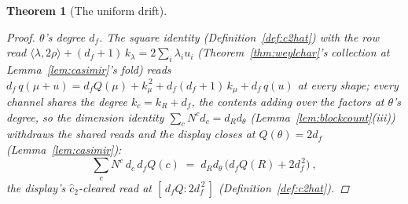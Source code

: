 \documentclass[11pt]{article}
\newtheorem{theorem}{Theorem}
\theoremstyle{definition}
\begin{document}
\begin{theorem}[The uniform drift]
\begin{proof}
$\theta$'s degree $d_f$. The square identity
(Definition~\ref{def:c2hat}) with the row read
$\langle\lambda,2\rho\rangle+(d_f+1)\,k_\lambda
=2\sum_i\lambda_iu_i$ (Theorem~\ref{thm:weylchar}'s collection at
Lemma~\ref{lem:casimir}'s fold) reads
$d_f\,q(\mu+u)=d_fQ(\mu)+k_\mu^{\,2}+d_f(d_f+1)\,k_\mu
+d_f\,q(u)$ at every shape; every channel shares the degree
$k_c=k_R+d_f$, the contents adding over the factors at $\theta$'s
degree, so the dimension identity $\sum_cN^cd_c=d_Rd_\theta$
(Lemma~\ref{lem:blockcount}(iii)) withdraws the shared reads and
the display closes at $Q(\theta)=2d_f$
(Lemma~\ref{lem:casimir}):
\[
\sum_cN^c\,d_c\,d_fQ(c)\;=\;d_Rd_\theta\,
\big(d_fQ(R)+2d_f^{\,2}\big)\ ,
\]
the display's $\hat c_2$-cleared read at
$[\,d_fQ:2d_f^{\,2}\,]$ (Definition~\ref{def:c2hat}).
\end{proof}
\end{theorem}
\end{document}
